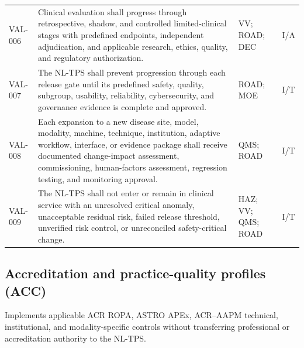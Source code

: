 \documentclass[11pt,letterpaper]{article}
\begin{document}
\begin{small}
\begin{longtable}{@{}L{0.0806\textwidth}L{0.5386\textwidth}L{0.1868\textwidth}L{0.1140\textwidth}@{}}
\addlinespace[2pt]
VAL-006 & Clinical evaluation shall progress through retrospective, shadow, and controlled limited-clinical stages with predefined endpoints, independent adjudication, and applicable research, ethics, quality, and regulatory authorization. & VV; ROAD; DEC & I\slash\allowbreak{}A \\
\addlinespace[2pt]
VAL-007 & The NL-TPS shall prevent progression through each release gate until its predefined safety, quality, subgroup, usability, reliability, cybersecurity, and governance evidence is complete and approved. & ROAD; MOE & I\slash\allowbreak{}T \\
\addlinespace[2pt]
VAL-008 & Each expansion to a new disease site, model, modality, machine, technique, institution, adaptive workflow, interface, or evidence package shall receive documented change-impact assessment, commissioning, human-factors assessment, regression testing, and monitoring approval. & QMS; ROAD & I\slash\allowbreak{}T \\
\addlinespace[2pt]
VAL-009 & The NL-TPS shall not enter or remain in clinical service with an unresolved critical anomaly, unacceptable residual risk, failed release threshold, unverified risk control, or unreconciled safety-critical change. & HAZ; VV; QMS; ROAD & I\slash\allowbreak{}T \\
\end{longtable}
\end{small}

\subsection{Accreditation and practice-quality profiles (ACC)}

Implements applicable ACR ROPA, ASTRO APEx, ACR--AAPM technical, institutional, and modality-specific controls without transferring professional or accreditation authority to the NL-TPS.
\end{document}
